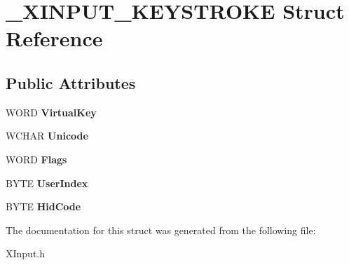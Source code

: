 \hypertarget{struct___x_i_n_p_u_t___k_e_y_s_t_r_o_k_e}{}\section{\+\_\+\+X\+I\+N\+P\+U\+T\+\_\+\+K\+E\+Y\+S\+T\+R\+O\+K\+E Struct Reference}
\label{struct___x_i_n_p_u_t___k_e_y_s_t_r_o_k_e}
\subsection*{Public Attributes}
\begin{DoxyCompactItemize}
\item 
\hypertarget{struct___x_i_n_p_u_t___k_e_y_s_t_r_o_k_e_ab47bde7950a6d99b87f8cfe896b60c82}{}W\+O\+R\+D {\bfseries Virtual\+Key}\label{struct___x_i_n_p_u_t___k_e_y_s_t_r_o_k_e_ab47bde7950a6d99b87f8cfe896b60c82}

\item 
\hypertarget{struct___x_i_n_p_u_t___k_e_y_s_t_r_o_k_e_aaa16bd0ba9849fc4be79f3d5ebc01e25}{}W\+C\+H\+A\+R {\bfseries Unicode}\label{struct___x_i_n_p_u_t___k_e_y_s_t_r_o_k_e_aaa16bd0ba9849fc4be79f3d5ebc01e25}

\item 
\hypertarget{struct___x_i_n_p_u_t___k_e_y_s_t_r_o_k_e_a3bd348da2bd2ce5d16f70b9ae5cbcd7b}{}W\+O\+R\+D {\bfseries Flags}\label{struct___x_i_n_p_u_t___k_e_y_s_t_r_o_k_e_a3bd348da2bd2ce5d16f70b9ae5cbcd7b}

\item 
\hypertarget{struct___x_i_n_p_u_t___k_e_y_s_t_r_o_k_e_ae749b05e8fa58ef8699ad857f631f161}{}B\+Y\+T\+E {\bfseries User\+Index}\label{struct___x_i_n_p_u_t___k_e_y_s_t_r_o_k_e_ae749b05e8fa58ef8699ad857f631f161}

\item 
\hypertarget{struct___x_i_n_p_u_t___k_e_y_s_t_r_o_k_e_a432d7fc2814d61ae3d210eb1254c4589}{}B\+Y\+T\+E {\bfseries Hid\+Code}\label{struct___x_i_n_p_u_t___k_e_y_s_t_r_o_k_e_a432d7fc2814d61ae3d210eb1254c4589}

\end{DoxyCompactItemize}


The documentation for this struct was generated from the following file\+:\begin{DoxyCompactItemize}
\item 
X\+Input.\+h\end{DoxyCompactItemize}
